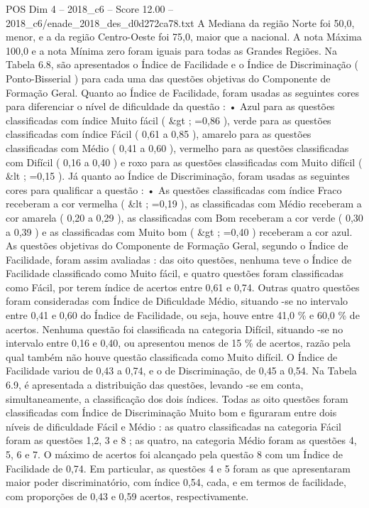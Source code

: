 \begin{textsample}{POS Dim 4 – 2018\_c6 – Score 12.00 – 2018\_c6/enade\_2018\_des\_d0d272ca78.txt}
A Mediana da região Norte foi 50,0, menor, e a da região Centro-Oeste foi 75,0, maior que a nacional.
A nota Máxima 100,0 e a nota Mínima zero foram iguais para todas as Grandes Regiões.
Na Tabela 6.8, são apresentados o Índice de Facilidade e o Índice de Discriminação ( Ponto-Bisserial ) para cada uma das questões objetivas do Componente de Formação Geral.
Quanto ao Índice de Facilidade, foram usadas as seguintes cores para diferenciar o nível de dificuldade da questão : • Azul para as questões classificadas com índice Muito fácil ( \&gt ; =0,86 ), verde para as questões classificadas com índice Fácil ( 0,61 a 0,85 ), amarelo para as questões classificadas com Médio ( 0,41 a 0,60 ), vermelho para as questões classificadas com Difícil ( 0,16 a 0,40 ) e roxo para as questões classificadas com Muito difícil ( \&lt ; =0,15 ).
Já quanto ao Índice de Discriminação, foram usadas as seguintes cores para qualificar a questão : • As questões classificadas com índice Fraco receberam a cor vermelha ( \&lt ; =0,19 ), as classificadas com Médio receberam a cor amarela ( 0,20 a 0,29 ), as classificadas com Bom receberam a cor verde ( 0,30 a 0,39 ) e as classificadas com Muito bom ( \&gt ; =0,40 ) receberam a cor azul.
As questões objetivas do Componente de Formação Geral, segundo o Índice de Facilidade, foram assim avaliadas : das oito questões, nenhuma teve o Índice de Facilidade classificado como Muito fácil, e quatro questões foram classificadas como Fácil, por terem índice de acertos entre 0,61 e 0,74.
Outras quatro questões foram consideradas com Índice de Dificuldade Médio, situando -se no intervalo entre 0,41 e 0,60 do Índice de Facilidade, ou seja, houve entre 41,0 \% e 60,0 \% de acertos.
Nenhuma questão foi classificada na categoria Difícil, situando -se no intervalo entre 0,16 e 0,40, ou apresentou menos de 15 \% de acertos, razão pela qual também não houve questão classificada como Muito difícil.
O Índice de Facilidade variou de 0,43 a 0,74, e o de Discriminação, de 0,45 a 0,54.
Na Tabela 6.9, é apresentada a distribuição das questões, levando -se em conta, simultaneamente, a classificação dos dois índices.
Todas as oito questões foram classificadas com Índice de Discriminação Muito bom e figuraram entre dois níveis de dificuldade Fácil e Médio : as quatro classificadas na categoria Fácil foram as questões 1,2, 3 e 8 ; as quatro, na categoria Médio foram as questões 4, 5, 6 e 7.
O máximo de acertos foi alcançado pela questão 8 com um Índice de Facilidade de 0,74.
Em particular, as questões 4 e 5 foram as que apresentaram maior poder discriminatório, com índice 0,54, cada, e em termos de facilidade, com proporções de 0,43 e 0,59 acertos, respectivamente.

\end{textsample}
